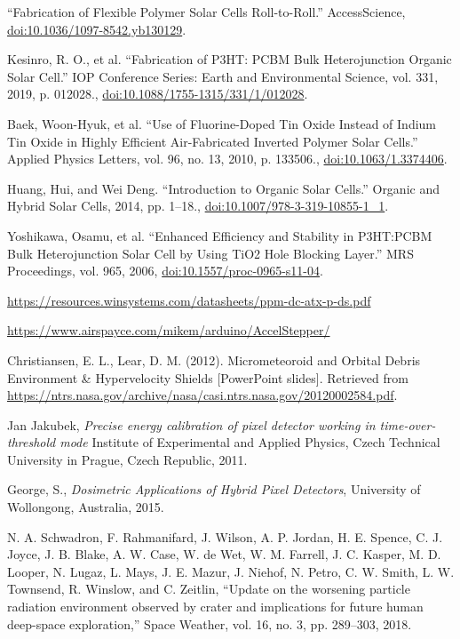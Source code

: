 \begin{thebibliography}{9}
  “Fabrication of Flexible Polymer Solar Cells Roll-to-Roll.” AccessScience, \url{doi:10.1036/1097-8542.yb130129}.
  
  Kesinro, R. O., et al. “Fabrication of P3HT: PCBM Bulk Heterojunction Organic Solar Cell.” IOP Conference Series: Earth and Environmental Science, vol. 331, 2019, p. 012028., \url{doi:10.1088/1755-1315/331/1/012028}.
  
  Baek, Woon-Hyuk, et al. “Use of Fluorine-Doped Tin Oxide Instead of Indium Tin Oxide in Highly Efficient Air-Fabricated Inverted Polymer Solar Cells.” Applied Physics Letters, vol. 96, no. 13, 2010, p. 133506., \url{doi:10.1063/1.3374406}.
  
  Huang, Hui, and Wei Deng. “Introduction to Organic Solar Cells.” Organic and Hybrid Solar Cells, 2014, pp. 1–18., \url{doi:10.1007/978-3-319-10855-1_1}.
  
  Yoshikawa, Osamu, et al. “Enhanced Efficiency and Stability in P3HT:PCBM Bulk Heterojunction Solar Cell by Using TiO2 Hole Blocking Layer.” MRS Proceedings, vol. 965, 2006, \url{doi:10.1557/proc-0965-s11-04}.

\url{https://resources.winsystems.com/datasheets/ppm-dc-atx-p-ds.pdf}

\url{https://www.airspayce.com/mikem/arduino/AccelStepper/}

  Christiansen, E. L., Lear, D. M. (2012). Micrometeoroid and Orbital Debris Environment \& Hypervelocity Shields [PowerPoint slides]. Retrieved from \url{https://ntrs.nasa.gov/archive/nasa/casi.ntrs.nasa.gov/20120002584.pdf}.

  Jan Jakubek, \textit{Precise energy calibration of pixel detector working in time-over-threshold mode} Institute of Experimental and Applied Physics, Czech Technical University in Prague, Czech Republic, 2011.

  George, S., \textit{Dosimetric Applications of Hybrid Pixel Detectors}, University of Wollongong, Australia, 2015.

N. A. Schwadron, F. Rahmanifard, J. Wilson, A. P. Jordan, H. E. Spence, C. J. Joyce, J. B.
Blake, A. W. Case, W. de Wet, W. M. Farrell, J. C. Kasper, M. D. Looper, N. Lugaz, L. Mays,
J. E. Mazur, J. Niehof, N. Petro, C. W. Smith, L. W. Townsend, R. Winslow, and C. Zeitlin,
“Update on the worsening particle radiation environment observed by crater and implications
for future human deep-space exploration,” Space Weather, vol. 16, no. 3, pp. 289–303, 2018.






\end{thebibliography}
